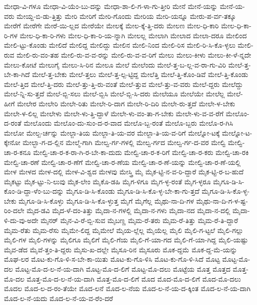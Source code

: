 {ಮೇಧಾ-ವಿ-ಗಳೂ
ಮೇಧಾ-ವಿ-ಯೆಂ-ಬು-ದನ್ನು
ಮೇಧಾ-ಶಾ-ಲಿ-ಗ-ಳಾ-ಗು-ತ್ತೀರಿ
ಮೇನೆ
ಮೇನೆ-ಯನ್ನು
ಮೇನೆ-ಯ-ವರು
ಮೇಯ್ದ-ಬಿ-ಡು-ತ್ತಿತ್ತು
ಮೇರಿ
ಮೇರಿಗೆ
ಮೇರಿ-ಗೊಂದು
ಮೇರಿಯ
ಮೇರಿ-ಯನ್ನೂ
ಮೇರು-ಪ-ರ್ವ-ತಕ್ಕೂ
ಮೇರೆಗೆ
ಮೇರೆಗೇ
ಮೇರೆ-ಯಿ-ಲ್ಲದ
ಮೇರೆಯೇ
ಮೇಲಕ್ಕೆ
ಮೇಲ-ಕ್ಕೆ-ತ್ತಿ-ದರು
ಮೇಲಣ
ಮೇಲ-ಧಿ-ಕಾರಿ
ಮೇಲ-ಧಿ-ಕಾ-ರಿ-ಗಳ
ಮೇಲ-ಧಿ-ಕಾ-ರಿ-ಗಳು
ಮೇಲ-ಧಿ-ಕಾ-ರಿ-ಯ-ನ್ನಾಗಿ
ಮೇಲಲ್ಲ
ಮೇಲಾಗಿ
ಮೇಲಾದ
ಮೇಲಾ-ದರೂ
ಮೇಲಿಂದ
ಮೇಲಿ-ಟ್ಟು-ಕೊಂಡು
ಮೇಲಿದೆ
ಮೇಲಿದ್ದ
ಮೇಲಿದ್ದು
ಮೇಲಿನ
ಮೇಲಿ-ನಿಂದ
ಮೇಲಿ-ರಿಸ
ಮೇಲಿ-ರಿ-ಸಿ-ಕೊ-ಳ್ಳಲು
ಮೇಲಿ-ರುವ
ಮೇಲಿ-ರು-ವಂ-ತಹ
ಮೇಲಿ-ರು-ವ-ವ-ರನ್ನು
ಮೇಲಿ-ರು-ವ-ವ-ರಿಗೆ
ಮೇಲು
ಮೇಲು-ಕೀಳು
ಮೇಲು-ಕೀ-ಳೆ-ನ್ನದೇ
ಮೇಲು-ಕೋಟೆ
ಮೇಲುಗೈ
ಮೇಲು-ಸಿ-ರಿನ
ಮೇಲೂ
ಮೇಲೆ
ಮೇಲೆಂದು
ಮೇಲೆ-ತ್ತ-ಬ-ಲ್ಲ-ವ-ರಾ-ಗು-ವಿರಿ
ಮೇಲೆ-ತ್ತ-ಬೇ-ಕಾ-ಗಿದೆ
ಮೇಲೆ-ತ್ತ-ಬೇಕು
ಮೇಲೆ-ತ್ತಲು
ಮೇಲೆ-ತ್ತ-ಲ್ಪ-ಟ್ಟಿದ್ದ
ಮೇಲೆತ್ತಿ
ಮೇಲೆ-ತ್ತಿ-ಕೊಂ-ಡಿವೆ
ಮೇಲೆ-ತ್ತಿ-ಕೊಂಡು
ಮೇಲೆ-ತ್ತಿದ
ಮೇಲೆ-ತ್ತಿ-ದರು
ಮೇಲೆ-ತ್ತು-ತ್ತಿ-ರು-ವಂತೆ
ಮೇಲೆ-ತ್ತುವ
ಮೇಲೆ-ತ್ತು-ವ-ವರು
ಮೇಲೆ-ದ್ದರು
ಮೇಲೆದ್ದು
ಮೇಲೆ-ನ್ನಿ-ಸು-ತ್ತದೆ
ಮೇಲೆ-ಬ್ಬಿ-ಸಲು
ಮೇಲೆ-ಬ್ಬಿಸಿ
ಮೇಲೆ-ಬ್ಬಿ-ಸಿ-ದರು
ಮೇಲೆಯೂ
ಮೇಲೆಯೇ
ಮೇಲೆಲ್ಲ
ಮೇಲೆ-ಹೀಗೆ
ಮೇಲೇರ
ಮೇಲೇರಿ
ಮೇಲೇ-ರಿತು
ಮೇಲೇ-ರಿ-ದಾಗ
ಮೇಲೇ-ರಿ-ದಿರಿ
ಮೇಲೇ-ರು-ತ್ತದೆ
ಮೇಲೇ-ಳ-ಬೇಕು
ಮೇಲೇ-ಳ-ಲಿಲ್ಲ
ಮೇಲೇಳು
ಮೇಲೇ-ಳು-ತ್ತಿ-ದ್ದಾಳೆ
ಮೇಲೇ-ಳು-ವಂ-ತಾ-ಗ-ಬೇಕು
ಮೇಲೇ-ಳು-ವ-ವ-ರೆಗೆ
ಮೇಲೊಂ-ದ-ರಂತೆ
ಮೇಲೊಂದು
ಮೇಲೊಂ-ದು-ಸುಂ-ದ-ರ-ವಾದ
ಮೇಲೊ-ಬ್ಬ-ರಂತೆ
ಮೇಲೊ-ಬ್ಬರು
ಮೇಲೊ-ರ-ಗಿಸಿ
ಮೇಲೋ
ಮೇಲ್ಖ-ರ್ಚನ್ನು
ಮೇಲ್ಜಾ-ತಿಯ
ಮೇಲ್ಜಾ-ತಿ-ಯ-ವರ
ಮೇಲ್ಜಾ-ತಿ-ಯ-ವ-ರಿಗೆ
ಮೇಲ್ನೋ-ಟಕ್ಕೆ
ಮೇಲ್ನೋ-ಟ-ಕ್ಕೇನೋ
ಮೇಲ್ಭಾ-ಗ-ದ-ಲ್ಲಿನ
ಮೇಲ್ಮೆ-ಗಾಗಿ
ಮೇಲ್ವ-ರ್ಗ-ಗಳಲ್ಲಿ
ಮೇಲ್ವ-ರ್ಗದ
ಮೇಲ್ವ-ರ್ಗ-ದ-ವರ
ಮೇಲ್ವಿ
ಮೇಲ್ವಿ-ಚಾ-ರ-ಕನೂ
ಮೇಲ್ವಿ-ಚಾ-ರ-ಕ-ರಾ-ಗಿ-ರ-ಬೇ-ಕಾ-ದುದು
ಮೇಲ್ವಿ-ಚಾ-ರ-ಕ-ರಿಗೆ
ಮೇಲ್ವಿ-ಚಾ-ರ-ಕರು
ಮೇಲ್ವಿ-ಚಾ-ರಕಿ
ಮೇಲ್ವಿ-ಚಾ-ರಣೆ
ಮೇಲ್ವಿ-ಚಾ-ರ-ಣೆಗೆ
ಮೇಲ್ವಿ-ಚಾ-ರ-ಣೆಯ
ಮೇಲ್ವಿ-ಚಾ-ರ-ಣೆ-ಯನ್ನು
ಮೇಲ್ವಿ-ಚಾ-ರ-ಣೆ-ಯಲ್ಲಿ
ಮೇಳ
ಮೇಳದ
ಮೇಳ-ದಲ್ಲಿ
ಮೇಳ-ವಿ-ಶ್ವದ
ಮೇಳವು
ಮೇಸ್ತ್ರಿ
ಮೈ
ಮೈಕ-ಟ್ಟಿ-ನ-ವ-ರಿ-ದ್ದಾರೆ
ಮೈಕ-ಟ್ಟಿ-ರ-ಬ-ಹುದೆ
ಮೈಕಟ್ಟು
ಮೈಕ-ಟ್ಟು-ನಿ-ಲುವು
ಮೈಕ-ಲೇಂ
ಮೈಕೊ-ಡಹಿ
ಮೈಗ-ಳಿಗೂ
ಮೈಗ-ಳ್ಳ-ರಂತೆ
ಮೈಗ-ಳ್ಳರೂ
ಮೈಗೂ-ಡಿ-ಸಿ-ಕೊಂ-ಡಿ-ದ್ದಾ-ಳೆಂ-ಬು-ದನ್ನು
ಮೈಗೂ-ಡಿ-ಸಿ-ಕೊಂಡು
ಮೈಗೂ-ಡಿ-ಸಿ-ಕೊ-ಳ್ಳ-ಬೇ-ಕಾ-ಗು-ತ್ತದೆ
ಮೈಗೂ-ಡಿ-ಸಿ-ಕೊ-ಳ್ಳ-ಬೇಕು
ಮೈಗೂ-ಡಿ-ಸಿ-ಕೊಳ್ಳು
ಮೈಗೂ-ಡಿ-ಸಿ-ಕೊ-ಳ್ಳುತ್ತ
ಮೈಗೆ
ಮೈಗೆಲ್ಲ
ಮೈಥು-ನಾ-ದಿ-ಗಳ
ಮೈಥು-ನಾ-ದಿ-ಗ-ಳ-ಷ್ಟ-ರಿಂ-ದಲೇ
ಮೈದ-ಡವಿ
ಮೈದ-ಳೆ-ದಂ-ತಿತ್ತು
ಮೈದಾ-ನ-ಗಳಲ್ಲಿ
ಮೈದಾ-ನ-ಗಳು
ಮೈದಾ-ನದ
ಮೈದಾ-ನ-ದಲ್ಲಿ
ಮೈದಾ-ಳಿ-ದು-ವು-ಅದೇ
ಮೈನರ್
ಮೈನ-ವಿ-ರೆ-ಬ್ಬಿ-ಸುವ
ಮೈಬಣ್ಣ
ಮೈಮ-ರೆ-ತರು
ಮೈಮ-ರೆ-ತಿತ್ತು
ಮೈಮ-ರೆ-ತಿ-ದ್ದಾರೆ
ಮೈಮ-ರೆತು
ಮೈಮ-ರೆಸು
ಮೈಮೇ-ಲಿದ್ದ
ಮೈಮೇಲೆ
ಮೈಯ-ಲ್ಲೆಲ್ಲ
ಮೈಯೆಲ್ಲ
ಮೈಲಿ
ಮೈಲಿ-ಗ-ಟ್ಟಲೆ
ಮೈಲಿ-ಗಲ್ಲು
ಮೈಲಿ-ಗಳ
ಮೈಲಿ-ಗಳನ್ನು
ಮೈಲಿಗೂ
ಮೈಲಿಗೆ
ಮೈಲಿ-ಗೆಯ
ಮೈಲಿ-ಗೆ-ಯಾ-ಗದ
ಮೈಲಿ-ಗೆ-ಯಾ-ಗಿದ್ದ
ಮೈಲಿ-ಯಷ್ಟು
ಮೈವ-ಡೆದ
ಮೈವೆ-ತ್ತಂ-ತಿ-ದ್ದರು
ಮೈಸು-ಖ-ದಲ್ಲೇ
ಮೈಸೂ-ರಿನ
ಮೈಸೂರು
ಮೊಕ-ದ್ದಮೆ
ಮೊಕ-ದ್ದ-ಮೆ-ಯನ್ನು
ಮೊಘ-ಲರ
ಮೊಟ-ಕು-ಗೊ-ಳಿ-ಸ-ಬೇ-ಕಾ-ಯಿತು
ಮೊಟ-ಕು-ಗೊ-ಳಿಸಿ
ಮೊಟ-ಕು-ಗೊ-ಳಿ-ಸಿದೆ
ಮೊಟ್ಟ
ಮೊಟ್ಟ-ಮೊ-ದಲ
ಮೊಟ್ಟ-ಮೊ-ದ-ಲ-ನೆ-ಯ-ದಾಗಿ
ಮೊಟ್ಟ-ಮೊ-ದ-ಲಿಗೆ
ಮೊಟ್ಟ-ಮೊ-ದಲು
ಮೊಟ್ಟೆಯ
ಮೊತ್ತ
ಮೊತ್ತದ
ಮೊತ್ತ-ಮೊ-ದಲ
ಮೊತ್ತ-ಮೊ-ದ-ಲ-ನೆ-ಯ-ದಾಗಿ
ಮೊತ್ತ-ಮೊ-ದ-ಲಿಗೆ
ಮೊದ
ಮೊದ-ಮೊ-ದ-ಲಿಗೆ
ಮೊದ-ಮೊ-ದಲು
ಮೊದಲ
ಮೊದ-ಲ-ದ-ರಂ-ತೆಯೇ
ಮೊದ-ಲನೆ
ಮೊದ-ಲ-ನೆಯ
ಮೊದ-ಲ-ನೆ-ಯ-ದ-ಕ್ಕಿಂತ
ಮೊದ-ಲ-ನೆ-ಯ-ದಾಗಿ
ಮೊದ-ಲ-ನೆ-ಯದು
ಮೊದ-ಲ-ನೆ-ಯ-ವ-ರೆಂ-ದರೆ
}
